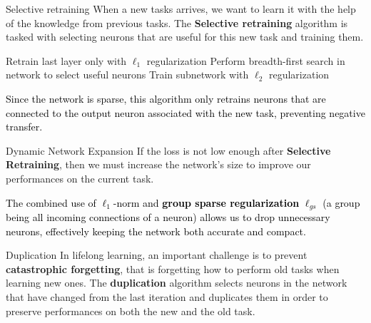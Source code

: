 \documentclass[a0paper,portrait]{baposter}
\begin{document}
\begin{poster}
\begin{posterbox}[name=SR,column=1,below=archi]{Selective retraining}
When a new tasks arrives, we want to learn it with the help of the knowledge from previous tasks. The \textbf{Selective retraining} algorithm is tasked with selecting neurons that are useful for this new task and training them.

\begin{algorithm}[H]
\small
\caption{Selective Retraining}
\Indm
{}
\Indp
    Retrain last layer only with $\ell_1$ regularization\;
    Perform breadth-first search in network to select useful neurons\;
    Train subnetwork with $\ell_2$ regularization\;
\end{algorithm}
\textcolor{black}{
Since the network is sparse, this algorithm only retrains neurons that are connected to the output neuron associated with the new task, preventing negative transfer.
}
\end{posterbox}



\begin{posterbox}[name=DNE,column=1,below=SR]{Dynamic Network Expansion}
If the loss is not low enough after \textbf{Selective Retraining}, then we must increase the network's size to improve our performances on the current task.

\begin{algorithm}[H]
\small
\caption{Dynamic Expansion}
\Indm
{}
\Indp
\end{algorithm}
\textcolor{black}{
The combined use of $\ell_1$-norm and \textbf{group sparse regularization} $\ell_{gs}$ (a group being all incoming connections of a neuron) allows us to drop unnecessary neurons, effectively keeping the network both accurate and compact.
}
\end{posterbox}







\begin{posterbox}[name=dup,column=2,below=archi]{Duplication}
In lifelong learning, an important challenge is to prevent \textbf{catastrophic forgetting}, that is forgetting how to perform old tasks when learning new ones. The \textbf{duplication} algorithm selects neurons in the network that have changed from the last iteration and duplicates them in order to preserve performances on both the new and the old task.


\end{posterbox}
\end{poster}
\end{document}
